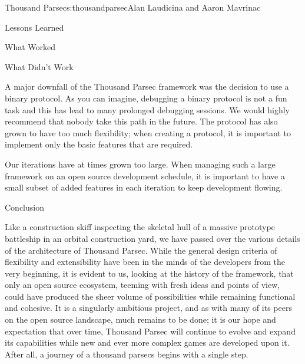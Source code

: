 \begin{aosachapter}{Thousand Parsec}{s:thousandparsec}{Alan Laudicina and Aaron Mavrinac}
\begin{aosasect1}{Lessons Learned}
\begin{aosasect2}{What Worked}
\end{aosasect2}

\begin{aosasect2}{What Didn't Work}

A major downfall of the Thousand Parsec framework was the decision to
use a binary protocol. As you can imagine, debugging a binary protocol
is not a fun task and this has lead to many prolonged debugging
sessions. We would highly recommend that nobody take this path in the
future. The protocol has also grown to have too much flexibility; when
creating a protocol, it is important to implement only the basic
features that are required.

Our iterations have at times grown too large. When managing such a
large framework on an open source development schedule, it is
important to have a small subset of added features in each iteration
to keep development flowing.

\end{aosasect2}

\begin{aosasect2}{Conclusion}

Like a construction skiff inspecting the skeletal hull of a massive
prototype battleship in an orbital construction yard, we have passed
over the various details of the architecture of Thousand Parsec. While
the general design criteria of flexibility and extensibility have been
in the minds of the developers from the very beginning, it is evident
to us, looking at the history of the framework, that only an open
source ecosystem, teeming with fresh ideas and points of view, could
have produced the sheer volume of possibilities while remaining
functional and cohesive. It is a singularly ambitious project, and as
with many of its peers on the open source landscape, much remains to
be done; it is our hope and expectation that over time, Thousand
Parsec will continue to evolve and expand its capabilities while new
and ever more complex games are developed upon it. After all, a
journey of a thousand parsecs begins with a single step.

\end{aosasect2}

\end{aosasect1}

\end{aosachapter}
